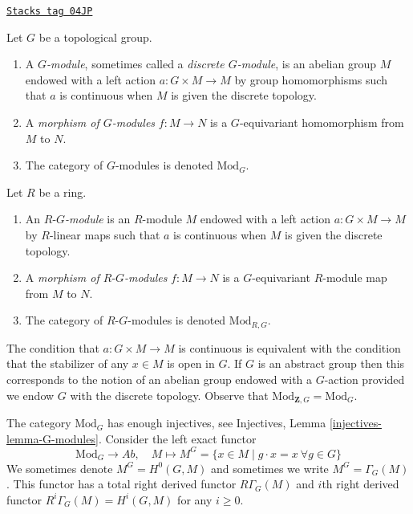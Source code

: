 \begin{definition}
\label{etale-cohomology-definition-G-module-continuous}
\href{https://stacks.math.columbia.edu/tag/04JP}{\texttt{Stacks tag 04JP}}

Let $G$ be a topological group.
\begin{enumerate}
\item A {\it $G$-module}, sometimes called a {\it discrete $G$-module},
is an abelian group $M$ endowed with a left action $a : G \times M \to M$
by group homomorphisms such that $a$ is continuous when $M$ is given the
discrete topology.
\item A {\it morphism of $G$-modules} $f : M \to N$ is a
$G$-equivariant homomorphism from $M$ to $N$.
\item The category of $G$-modules is denoted $\text{Mod}_G$.
\end{enumerate}
Let $R$ be a ring.
\begin{enumerate}
\item An {\it $R\text{-}G$-module} is an $R$-module $M$ endowed with
a left action $a : G \times M \to M$ by $R$-linear maps such that $a$
is continuous when $M$ is given the discrete topology.
\item A {\it morphism of $R\text{-}G$-modules} $f : M \to N$ is a
$G$-equivariant $R$-module map from $M$ to $N$.
\item The category of $R\text{-}G$-modules is denoted $\text{Mod}_{R, G}$.
\end{enumerate}
\end{definition}

The condition that $a : G \times M \to M$ is continuous is equivalent
with the condition that the stabilizer of any $x \in M$ is open in $G$.
If $G$ is an abstract group then this corresponds to the notion of an
abelian group endowed with a $G$-action provided we endow $G$ with the
discrete topology. Observe that $\text{Mod}_{\mathbf{Z}, G} = \text{Mod}_G$.

\medskip\noindent
The category $\text{Mod}_G$ has enough injectives, see
Injectives, Lemma \ref{injectives-lemma-G-modules}.
Consider the left exact functor
$$
\text{Mod}_G \longrightarrow \textit{Ab},
\quad
M \longmapsto M^G =
\{x \in M \mid g \cdot x = x\ \forall g \in G\}
$$
We sometimes denote $M^G = H^0(G, M)$ and sometimes we write
$M^G = \Gamma_G(M)$. This functor has a total right derived functor
$R\Gamma_G(M)$ and $i$th right derived functor
$R^i\Gamma_G(M) = H^i(G, M)$ for any $i \geq 0$.

